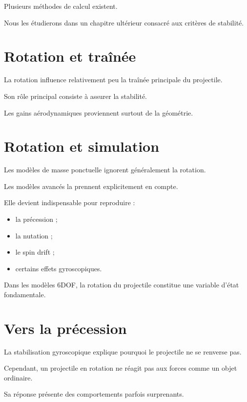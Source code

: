 Plusieurs méthodes de calcul existent.

Nous les étudierons dans un chapitre ultérieur consacré aux critères de
stabilité.

\section{Rotation et traînée}

La rotation influence relativement peu la traînée principale du projectile.

Son rôle principal consiste à assurer la stabilité.

Les gains aérodynamiques proviennent surtout de la géométrie.

\section{Rotation et simulation}

Les modèles de masse ponctuelle ignorent généralement la rotation.

Les modèles avancés la prennent explicitement en compte.

Elle devient indispensable pour reproduire :

\begin{itemize}
    \item la précession ;
    \item la nutation ;
    \item le spin drift ;
    \item certains effets gyroscopiques.
\end{itemize}

\begin{simulation}

Dans les modèles 6DOF, la rotation du projectile constitue une variable
d'état fondamentale.

\end{simulation}

\section{Vers la précession}

La stabilisation gyroscopique explique pourquoi le projectile ne se renverse
pas.

Cependant, un projectile en rotation ne réagit pas aux forces comme un objet
ordinaire.

Sa réponse présente des comportements parfois surprenants.

